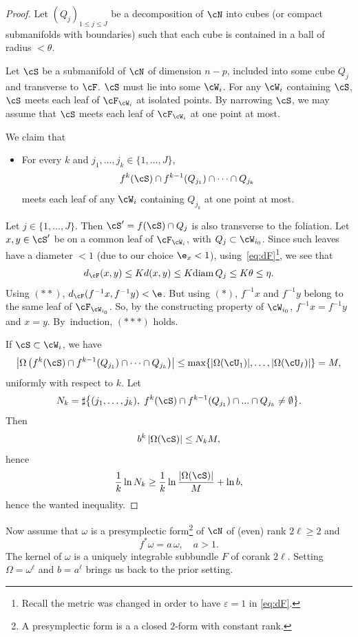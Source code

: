 \begin{proof}
Let $(Q_j)_{1 \leq j \leq J}$ be a decomposition of $\cN$ into cubes (or compact submanifolds with boundaries) such that each cube is contained in a ball of radius $< \theta$.

Let $\cS$ be a submanifold of $\cN$ of dimension $n-p$, included into some cube $Q_j$ and transverse to $\cF$. $\cS$ must lie into some $\cW_{i}$. For any $\cW_i$ containing $\cS$, $\cS$ meets each leaf of $\cF_{\cW_i}$ at isolated points. By narrowing $\cS$, we may assume that $\cS$ meets each leaf of $\cF_{\cW_{i}}$ at one point at most.

We claim that

\begin{itemize}
\item[$({*}{*}{*})$] For every $k$ and $j_1,\dots,j_k \in \{1,\dots,J\}$,
\[
f^{k}(\cS) \cap f^{k-1}(Q_{j_1}) \cap \cdots \cap Q_{j_k}
\]
meets each leaf of any $\cW_i$ containing $Q_{j_k}$ at one point at most.
\end{itemize}

Let $j \in \{1,\dots,J\}$. Then $\cS' = f(\cS) \cap Q_j$ is also transverse to the foliation. Let $x,y \in \cS'$ be on a common leaf of $\cF_{\cW_{i}}$, with $Q_j \subset \cW_{i_0}$. Since such leaves have a diameter $<1$ (due to our choice $\e_x<1$), using~\eqref{eq:dF}\footnote{Recall the metric was changed in order to have $\varepsilon=1$ in \eqref{eq:dF}.}, we see that
\[
d_\cF(x,y) \leq K d(x,y) \leq K \mathrm{diam}\, Q_j \leq K \theta \leq \eta.
\]
Using $(**)$, $d_\cF(f^{-1}x,f^{-1}y) < \e$. But using $(*)$, $f^{-1}x$ and $f^{-1}y$ belong to the same leaf of $\cF_{\cW_{i_0}}$. So, by the constructing property of $\cW_{i_0}$, $f^{-1}x=f^{-1}y$ and $x=y$. By~induction, $({*}{*}{*})$ holds.

If $\cS \subset \cW_i$, we have
\[
\left|\Omega\left(f^k(\cS) \cap f^{k-1}(Q_{j_1}) \cap \cdots \cap Q_{j_k} \right) \right| \leq \max \{|\Omega(\cU_1)|,\dots,
|\Omega(\cU_I)|\} = M,
\]
uniformly with respect to $k$. Let
\[
N_k = \sharp \bigl\{(j_1,\dots,j_k), \; f^k(\cS) \cap
f^{k-1}(Q_{j_1}) \cap... \cap Q_{j_k} \neq \emptyset\bigr\}.
\]
Then
\[
b^k\, |\Omega(\cS)| \leq N_k M,
\]
hence
\[
\frac{1}{k} \ln N_k \geq \frac{1}{k} \ln
\frac{|\Omega(\cS)|}{M} + \ln b,
\]
hence the wanted inequality.
\end{proof}

Now assume that $\omega$ is a presymplectic form\footnote{A
presymplectic form is a a closed $2$-form with constant rank.} of $\cN$ of (even) rank $2\ell \geq 2$ and
\[
f^*\omega = a \, \omega, \quad a >1.
\]
The kernel of $\omega$ is a uniquely integrable subbundle $F$ of corank $2\ell$. Setting $\Omega=\omega^\ell$ and $b=a^\ell$
brings us back to the prior setting.

